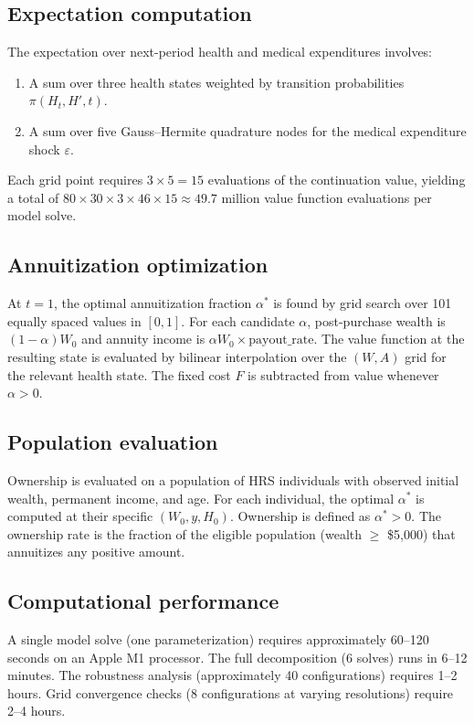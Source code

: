 \documentclass[12pt]{article}
\begin{document}
\subsection{Expectation computation}

The expectation over next-period health and medical expenditures involves:
\begin{enumerate}
\item A sum over three health states weighted by transition probabilities $\pi(H_t, H', t)$.
\item A sum over five Gauss--Hermite quadrature nodes for the medical expenditure shock $\varepsilon$.
\end{enumerate}
Each grid point requires $3 \times 5 = 15$ evaluations of the continuation value, yielding a total of $80 \times 30 \times 3 \times 46 \times 15 \approx 49.7$ million value function evaluations per model solve.

\subsection{Annuitization optimization}

At $t = 1$, the optimal annuitization fraction $\alpha^*$ is found by grid search over 101 equally spaced values in $[0, 1]$. For each candidate $\alpha$, post-purchase wealth is $(1 - \alpha)W_0$ and annuity income is $\alpha W_0 \times \text{payout\_rate}$. The value function at the resulting state is evaluated by bilinear interpolation over the $(W, A)$ grid for the relevant health state. The fixed cost $F$ is subtracted from value whenever $\alpha > 0$.

\subsection{Population evaluation}

Ownership is evaluated on a population of HRS individuals with observed initial wealth, permanent income, and age. For each individual, the optimal $\alpha^*$ is computed at their specific $(W_0, y, H_0)$. Ownership is defined as $\alpha^* > 0$. The ownership rate is the fraction of the eligible population (wealth $\geq$ \$5,000) that annuitizes any positive amount.

\subsection{Computational performance}

A single model solve (one parameterization) requires approximately 60--120 seconds on an Apple M1 processor. The full decomposition (6 solves) runs in 6--12 minutes. The robustness analysis (approximately 40 configurations) requires 1--2 hours. Grid convergence checks (8 configurations at varying resolutions) require 2--4 hours.




\end{document}
